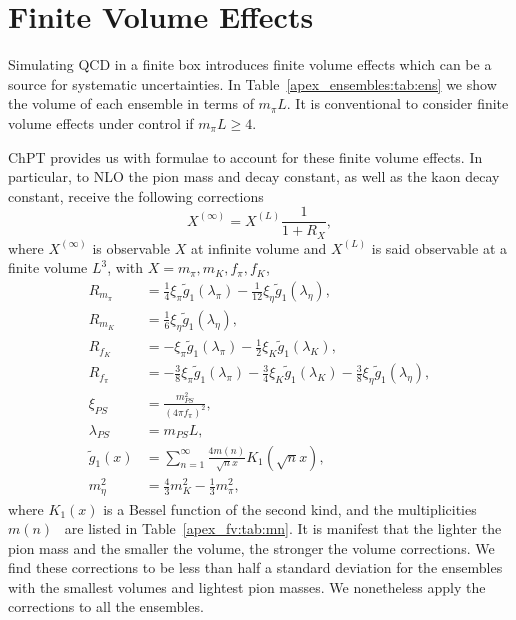 
\chapter{Finite Volume Effects}
\label{apex_fv}

Simulating QCD in a finite box introduces finite volume effects which can be a source for systematic uncertainties. In Table~\ref{apex_ensembles:tab:ens} we show the volume of each ensemble in terms of $m_{\pi}L$. It is conventional to consider finite volume effects under control if $m_{\pi}L\geq4$.

ChPT provides us with formulae to account for these finite volume effects. In particular, to NLO the pion mass and decay constant, as well as the kaon decay constant, receive the following corrections
\begin{equation}
X^{(\infty)}=X^{(L)}\frac{1}{1+R_X},
\end{equation}
where $X^{(\infty)}$ is observable $X$ at infinite volume and $X^{(L)}$ is said observable at a finite volume $L^3$, with $X=m_{\pi},m_K,f_{\pi},f_K$,
\begin{align}
R_{m_{\pi}}&=\frac{1}{4}\xi_{\pi}\tilde{g}_1(\lambda_{\pi})-\frac{1}{12}\xi_{\eta}\tilde{g}_1(\lambda_{\eta}), \\
R_{m_K}&=\frac{1}{6}\xi_{\eta}\tilde{g}_1(\lambda_{\eta}), \\
R_{f_K}&=-\xi_{\pi}\tilde{g}_1(\lambda_{\pi})-\frac{1}{2}\xi_{K}\tilde{g}_1(\lambda_{K}), \\
R_{f_{\pi}}&=-\frac{3}{8}\xi_{\pi}\tilde{g}_1(\lambda_{\pi})-\frac{3}{4}\xi_{K}\tilde{g}_1(\lambda_{K})-\frac{3}{8}\xi_{\eta}\tilde{g}_1(\lambda_{\eta}), \\
\xi_{PS}&=\frac{m_{PS}^2}{(4\pi f_{\pi})^2}, \\
\lambda_{PS}&=m_{PS}L, \\
\tilde{g}_1(x)&=\sum_{n=1}^{\infty}\frac{4m(n)}{\sqrt{n}x}K_1(\sqrt{n}x), \\
m_{\eta}^2&=\frac{4}{3}m_K^2-\frac{1}{3}m_{\pi}^2,
\end{align}
where $K_1(x)$ is a Bessel function of the second kind, and the multiplicities $m(n)$~\cite{} are listed in Table~\ref{apex_fv:tab:mn}. It is manifest that the lighter the pion mass and the smaller the volume, the stronger the volume corrections. We find these corrections to be less than half a standard deviation for the ensembles with the smallest volumes and lightest pion masses. We nonetheless apply the corrections to all the ensembles.

